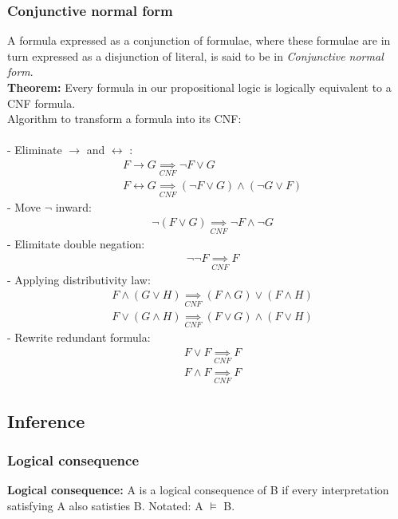 \documentclass[26pt,fleqn,]{article}
\begin{document}
\subsubsection{Conjunctive normal form}
A formula expressed as a conjunction of formulae, where these formulae are in turn expressed as
a disjunction of literal, is said to be in {\em Conjunctive normal form}.\\
{\bfseries Theorem:} Every formula in our propositional logic is logically equivalent to a CNF
formula.\\
Algorithm to transform a formula into its CNF:\\\\
\indent- Eliminate \(\to\) and \(\leftrightarrow\) :
\begin{align*}
	&F \to G \underset{CNF}{\implies} \neg F \vee G\\
	&F \leftrightarrow G \underset{CNF}{\implies} (\neg F \vee G) \wedge (\neg G \vee F)
\end{align*}
\indent- Move \(\neg\) inward: 
\begin{align*}
	&\neg (F \vee G) \underset{CNF}{\implies} \neg F \wedge \neg G
\end{align*}
\indent- Elimitate double negation:
\begin{align*}
	&\neg \neg F \underset{CNF}{\implies} F
\end{align*}
\indent- Applying distributivity law:
\begin{align*}
	&F \wedge (G \vee H) \underset{CNF}{\implies} (F \wedge G) \vee (F \wedge H)\\
	&F \vee (G \wedge H) \underset{CNF}{\implies} (F \vee G) \wedge (F \vee H)
\end{align*}	
\indent- Rewrite redundant formula:
\begin{align*}	
	&F \vee F \underset{CNF}{\implies} F\\
	&F \wedge F \underset{CNF}{\implies} F
\end{align*}
\subsection{Inference}
\subsubsection{Logical consequence}
{\bfseries Logical consequence:} A is a logical consequence of B if every interpretation 
satisfying A also satisties B. Notated: A \(\models\) B.\\
\end{document}
